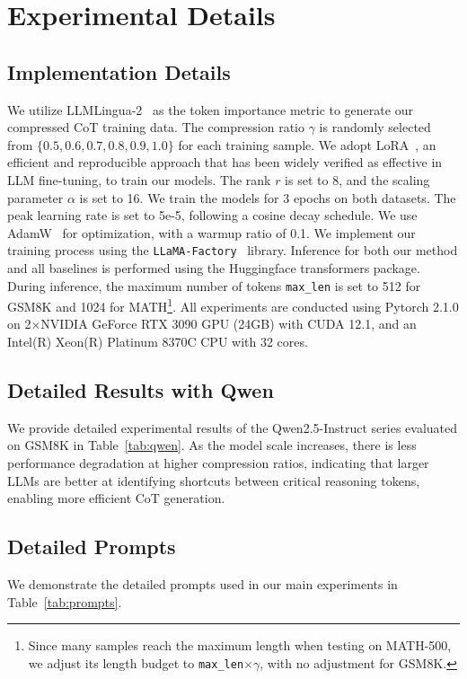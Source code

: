 \section{Experimental Details}
\label{appendix:exp_details}

\subsection{Implementation Details}
\label{appendix:training_details}
We utilize LLMLingua-2~\cite{pan:2024llmlingua2} as the token importance metric to generate our compressed CoT training data. The compression ratio $\gamma$ is randomly selected from $\{0.5, 0.6, 0.7, 0.8, 0.9, 1.0\}$ for each training sample. We adopt LoRA~\cite{lora}, an efficient and reproducible approach that has been widely verified as effective in LLM fine-tuning, to train our models. The rank $r$ is set to 8, and the scaling parameter $\alpha$ is set to 16. We train the models for 3 epochs on both datasets. The peak learning rate is set to 5e-5, following a cosine decay schedule. We use AdamW~\cite{AdamW} for optimization, with a warmup ratio of 0.1. We implement our training process using the \texttt{LLaMA-Factory}~\cite{llamafactory} library. Inference for both our method and all baselines is performed using the Huggingface transformers package. During inference, the maximum number of tokens \texttt{max\_len} is set to 512 for GSM8K and 1024 for MATH\footnote{Since many samples reach the maximum length when testing \method on MATH-500, we adjust its length budget to \texttt{max\_len}$\times\gamma$, with no adjustment for GSM8K.}. All experiments are conducted using Pytorch 2.1.0 on 2$\times$NVIDIA GeForce RTX 3090 GPU (24GB) with CUDA 12.1, and an Intel(R) Xeon(R) Platinum 8370C CPU with 32 cores.

\subsection{Detailed Results with Qwen}
\label{appendix:qwen_detail}
We provide detailed experimental results of the Qwen2.5-Instruct series evaluated on GSM8K in Table~\ref{tab:qwen}. As the model scale increases, there is less performance degradation at higher compression ratios, indicating that larger LLMs are better at identifying shortcuts between critical reasoning tokens, enabling more efficient CoT generation.



\subsection{Detailed Prompts}
\label{appendix:prompt_detail}
We demonstrate the detailed prompts used in our main experiments in Table~\ref{tab:prompts}.


